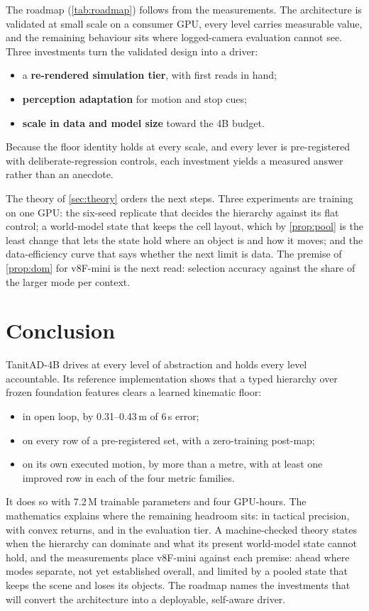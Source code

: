 \documentclass[10pt,twocolumn]{article}
\theoremstyle{remark}
\begin{document}
The roadmap (\cref{tab:roadmap}) follows from the measurements. The architecture is validated at small scale on a consumer GPU,
every level carries measurable value, and the remaining behaviour sits where logged-camera evaluation cannot see. Three investments
turn the validated design into a driver:
\begin{itemize}
  \item a \textbf{re-rendered simulation tier}, with first reads in hand;
  \item \textbf{perception adaptation} for motion and stop cues;
  \item \textbf{scale in data and model size} toward the 4B budget.
\end{itemize}
Because the floor identity holds at every scale, and every lever is pre-registered with deliberate-regression controls, each
investment yields a measured answer rather than an anecdote.

The theory of \cref{sec:theory} orders the next steps. Three experiments are training on one GPU: the six-seed replicate that
decides the hierarchy against its flat control; a world-model state that keeps the cell layout, which by \cref{prop:pool} is the
least change that lets the state hold where an object is and how it moves; and the data-efficiency curve that says whether the
next limit is data. The premise of \cref{prop:dom} for v8F-mini is the next read: selection accuracy against the share of the
larger mode per context.

\section{Conclusion}
TanitAD-4B drives at every level of abstraction and holds every level accountable. Its reference implementation shows that a typed
hierarchy over frozen foundation features clears a learned kinematic floor:
\begin{itemize}
  \item in open loop, by 0.31--0.43\,m of 6\,s error;
  \item on every row of a pre-registered set, with a zero-training post-map;
  \item on its own executed motion, by more than a metre, with at least one improved row in each of the four metric families.
\end{itemize}
It does so with 7.2\,M trainable parameters and four GPU-hours. The mathematics explains where the remaining headroom sits: in
tactical precision, with convex returns, and in the evaluation tier. A machine-checked theory states when the hierarchy can
dominate and what its present world-model state cannot hold, and the measurements place v8F-mini against each premise: ahead
where modes separate, not yet established overall, and limited by a pooled state that keeps the scene and loses its objects. The roadmap names the investments that will convert the
architecture into a deployable, self-aware driver.
\end{document}
